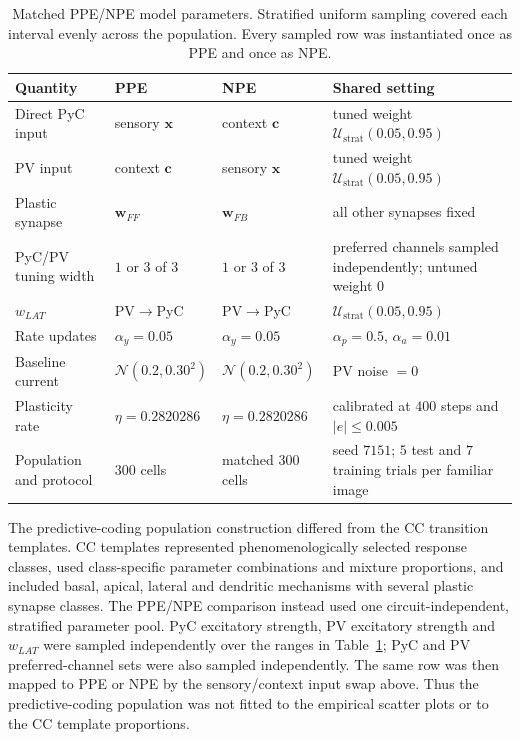 \begin{table}[h!]
\centering
\footnotesize
\setlength{\tabcolsep}{4pt}
\renewcommand{\arraystretch}{1.08}
\begin{tabular}{@{}p{}p{}p{}p{}@{}}
\toprule
Quantity & PPE & NPE & Shared setting \\
\midrule
Direct PyC input & sensory $\mathbf{x}$ & context $\mathbf{c}$
 & tuned weight $\mathcal{U}_{\mathrm{strat}}(0.05,0.95)$ \\
PV input & context $\mathbf{c}$ & sensory $\mathbf{x}$
 & tuned weight $\mathcal{U}_{\mathrm{strat}}(0.05,0.95)$ \\
Plastic synapse & $\mathbf{w}_{FF}$ & $\mathbf{w}_{FB}$
 & all other synapses fixed \\
PyC/PV tuning width & $1$ or $3$ of $3$ & $1$ or $3$ of $3$
 & preferred channels sampled independently; untuned weight $0$ \\
$w_{LAT}$ & PV$\rightarrow$PyC & PV$\rightarrow$PyC
 & $\mathcal{U}_{\mathrm{strat}}(0.05,0.95)$ \\
Rate updates & $\alpha_y=0.05$ & $\alpha_y=0.05$
 & $\alpha_p=0.5$, $\alpha_a=0.01$ \\
Baseline current & $\mathcal{N}(0.2,0.30^2)$ & $\mathcal{N}(0.2,0.30^2)$
 & PV noise $=0$ \\
Plasticity rate & $\eta=0.2820286$ & $\eta=0.2820286$
 & calibrated at $400$ steps and $|e|\leq0.005$ \\
Population and protocol & $300$ cells & matched $300$ cells
 & seed $7151$; $5$ test and $7$ training trials per familiar image \\
\bottomrule
\end{tabular}
\caption{Matched PPE/NPE model parameters. Stratified uniform sampling covered
each interval evenly across the population. Every sampled row was instantiated
once as PPE and once as NPE.}
\label{tab:predictive-coding-parameters}
\end{table}

The predictive-coding population construction differed from the CC transition
templates. CC templates represented phenomenologically selected response
classes, used class-specific parameter combinations and mixture proportions,
and included basal, apical, lateral and dendritic mechanisms with several
plastic synapse classes. The PPE/NPE comparison instead used one
circuit-independent, stratified parameter pool. PyC excitatory strength, PV
excitatory strength and $w_{LAT}$ were sampled independently over the ranges in
Table~\ref{tab:predictive-coding-parameters}; PyC and PV preferred-channel sets
were also sampled independently. The same row was then mapped to PPE or NPE by
the sensory/context input swap above. Thus the predictive-coding population was
not fitted to the empirical scatter plots or to the CC template proportions.


